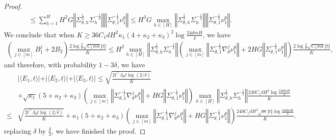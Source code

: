 \documentclass{article}
\numberwithin{equation}{section}
\begin{document}
\begin{proof}
\begin{align*}
    &\leq\sum_{h=1}^H H^2G\left\Vert\Sigma_{\theta,h}^{\frac{1}{2}}\Sigma_h^{-\frac{1}{2}}\right\Vert\left\Vert\Sigma_{\theta,1}^{-\frac{1}{2}}\nu^\theta_1\right\Vert\leq H^3G\max_{h\in[H]}\left\Vert\Sigma_{\theta,h}^{\frac{1}{2}}\Sigma_h^{-\frac{1}{2}}\right\Vert\left\Vert\Sigma_{\theta,1}^{-\frac{1}{2}}\nu^\theta_1\right\Vert.
\end{align*}
We conclude that when $K\geq 36C_1dH^2\kappa_1(4+\kappa_2+\kappa_3)^2\log\frac{24dmH}{\delta}$, we have
\begin{align*}
    \left(\max_{j\in[m]}B_1^j+2B_2\right)\frac{2\log\frac{2}{\delta}\sqrt{C_1md}\Vert t\Vert}{K}\leq H^2\max_{h\in[H]}\left\Vert\Sigma_{\theta,h}^{\frac{1}{2}}\Sigma_h^{-\frac{1}{2}}\right\Vert\left(\max_{j\in[m]}\left\Vert\Sigma_{\theta,1}^{-\frac{1}{2}}\nabla_\theta^j\nu^\theta_1\right\Vert+2HG\left\Vert\Sigma_{\theta,1}^{-\frac{1}{2}}\nu^\theta_1\right\Vert\right)\frac{2\log\frac{2}{\delta}\sqrt{C_1md}\Vert t\Vert}{K},
\end{align*}
and therefore, with probability $1-3\delta$, we have
\begin{align*}
    &\vert\langle E_1,t\rangle\vert+\vert\langle E_2,t\rangle\vert+\vert \langle E_3, t\rangle\vert\leq\sqrt{\frac{2t^\top\Lambda_\theta t\log(2/\delta)}{K}}\\
    &+\sqrt{\kappa_1}(5+\kappa_2+\kappa_3)\left(\max_{j\in[m]}\left\Vert\Sigma_{\theta,1}^{-\frac{1}{2}}\nabla_\theta^j\nu^\theta_1\right\Vert+HG\left\Vert\Sigma_{\theta,1}^{-\frac{1}{2}}\nu^\theta_1\right\Vert\right)\max_{h\in[H]}\left\Vert\Sigma_{\theta,h}^{\frac{1}{2}}\Sigma_h^{-\frac{1}{2}}\right\Vert\frac{240C_1dH^3\log\frac{24dmH}{\delta}}{K}\\
    \leq&\sqrt{\frac{2t^\top\Lambda_\theta t\log(2/\delta)}{K}}+\kappa_1(5+\kappa_2+\kappa_3)\left(\max_{j\in[m]}\left\Vert \Sigma_{\theta,1}^{-\frac{1}{2}}\nabla_\theta^j\nu^\theta_1\right\Vert+HG\left\Vert\Sigma_{\theta,1}^{-\frac{1}{2}}\nu^\theta_1\right\Vert\right)\frac{240C_1dH^3\sqrt{m}\Vert t\Vert\log\frac{24dmH}{\delta}}{K}.
\end{align*}
replacing $\delta$ by $\frac{\delta}{3}$, we have finished the proof. 
\end{proof}
\end{document}

